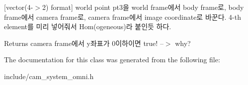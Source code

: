 \mbox{[}vector(4-\/$>$2) format\mbox{]} world point pt3을 world frame에서 body frame로, body frame에서 camera frame로, camera frame에서 image coordinate로 바꾼다. 4-\/th element를 미리 넣어줘서 Hom(ogeneous)라 붙인듯 하다. 

\begin{DoxyReturn}{Returns}
camera frame에서 y좌표가 0이하이면 true! --$>$ why? 
\end{DoxyReturn}


The documentation for this class was generated from the following file\+:\begin{DoxyCompactItemize}
\item 
include/cam\+\_\+system\+\_\+omni.\+h\end{DoxyCompactItemize}
